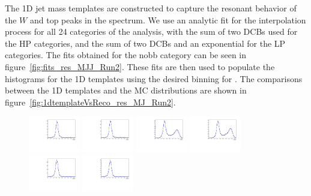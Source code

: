 The 1D jet mass templates are constructed to capture the resonant behavior of the $W$ and top peaks in the \MJ spectrum.
We use an analytic fit for the interpolation process for all 24 categories of the analysis, with the sum of two DCBs used for the HP categories, and the sum of two DCBs and an exponential for the LP categories.
The fits obtained for the nobb category can be seen in figure~\ref{fig:fits_res_MJJ_Run2}.
These fits are then used to populate the histograms for the 1D templates using the desired binning for \MJ.
The comparisons between the 1D templates and the MC distributions are shown in figure~\ref{fig:1dtemplateVsReco_res_MJ_Run2}.

\begin{figure}[htbp]
  \centering
  \includegraphics[width=0.2\textwidth]{fig/2Dfit/LNuJJ_res_MJJ_mu_HP_nobb_LDy.pdf}
  \includegraphics[width=0.2\textwidth]{fig/2Dfit/LNuJJ_res_MJJ_e_HP_nobb_LDy.pdf}
  \includegraphics[width=0.2\textwidth]{fig/2Dfit/LNuJJ_res_MJJ_mu_LP_nobb_LDy.pdf}
  \includegraphics[width=0.2\textwidth]{fig/2Dfit/LNuJJ_res_MJJ_e_LP_nobb_LDy.pdf}\\
  \includegraphics[width=0.2\textwidth]{fig/2Dfit/LNuJJ_res_MJJ_mu_HP_nobb_HDy.pdf}
  \includegraphics[width=0.2\textwidth]{fig/2Dfit/LNuJJ_res_MJJ_e_HP_nobb_HDy.pdf}

\end{figure}
